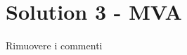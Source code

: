 \documentclass[final,a4paper,12pt,english]{UnicaPhdThesis3}
\begin{document}
	\section{Solution 3 - MVA}
	Rimuovere i commenti
\end{document}
